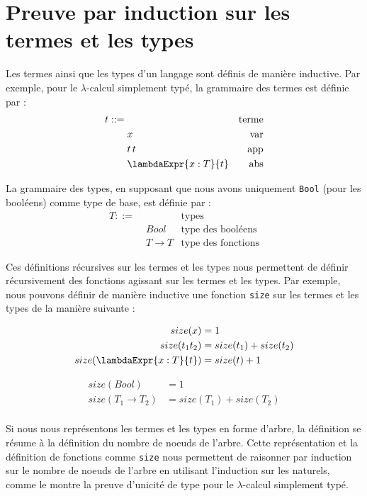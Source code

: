 \appendix
\chapter{Preuve par induction sur les termes et les types}

Les termes ainsi que les types d'un langage sont définis de manière inductive.
Par exemple, pour le $\lambda$-calcul simplement typé, la grammaire des termes
est définie par :
\begin{align*}
  t ::= & \, & \text{terme} \\
        & \; x & \text{var} \\
        & \; t \, t & \text{app} \\
        & \; \lambdaExpr{x : T}{t} & \text{abs}
\end{align*}

La grammaire des types, en supposant que nous avons uniquement \verb|Bool|
(pour les booléens) comme type de base, est définie par :
\begin{align*}
  T ::= & \, & \text{types} \\
        & \; Bool & \text{type des booléens} \\
        & \; T \rightarrow T & \text{type des fonctions}
\end{align*}

Ces définitions récursives sur les termes et les types nous permettent de
définir récursivement des fonctions agissant sur les termes et les types. Par
exemple, nous pouvons définir de manière inductive une fonction
\verb|size| sur les termes et les types de la manière suivante :

\begin{align*}
  size(x) & = 1 \\
  size(t_{1} t_{2}) & = size(t_{1}) + size(t_{2}) \\
  size(\lambdaExpr{x : T}{t}) & = size(t) + 1
\end{align*}

\begin{align*}
  size(Bool) & = 1 \\
  size(T_{1} \rightarrow T_{2}) & = size(T_{1}) + size(T_{2}) \\
\end{align*}

Si nous nous représentons les termes et les types en forme d'arbre, la
définition se résume à la définition du nombre de noeuds de l'arbre. Cette
représentation et la définition de fonctions comme \verb|size| nous permettent de
raisonner par induction sur le nombre de noeuds de l'arbre en utilisant l'induction sur
les naturels, comme le montre la preuve d'unicité de type pour le
$\lambda$-calcul simplement typé.

